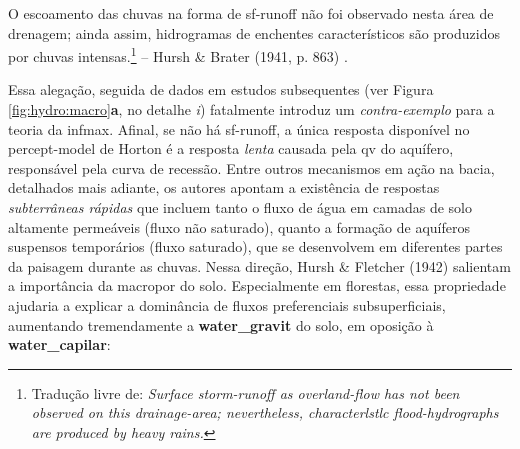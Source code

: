 \documentclass[./main.tex]{subfiles}
\begin{document}
\begin{adjustwidth}{100pt}{0pt}
\medskip
\small O escoamento das chuvas na forma de \gls{sf-runoff} não foi observado nesta área de drenagem; ainda assim, hidrogramas de enchentes característicos são produzidos por chuvas intensas.\footnote{Tradução livre de: \textit{Surface storm-runoff as overland-flow has not been observed on this drainage-area; nevertheless, characterlstlc flood-hydrographs are produced by heavy rains.}} -- Hursh \& Brater (1941, p. 863) \cite{Hursh1941}.
\medskip
\end{adjustwidth}

\noindent Essa alegação, seguida de dados em estudos subsequentes (ver Figura \ref{fig:hydro:macro}\textbf{a}, no detalhe \textit{i}) fatalmente introduz um \textit{contra-exemplo} para a \gls{teoria} da \gls{infmax}.  Afinal, se não há \gls{sf-runoff}, a única resposta disponível no \gls{percept-model} de Horton é a resposta \textit{lenta} causada pela \gls{qv} do aquífero, responsável pela curva de recessão. Entre outros mecanismos em ação na bacia, detalhados mais adiante, os autores apontam a existência de respostas \textit{subterrâneas rápidas} que incluem tanto o fluxo de água em camadas de solo altamente permeáveis (fluxo não saturado), quanto a formação de aquíferos suspensos temporários (fluxo saturado), que se desenvolvem em diferentes partes da paisagem durante as chuvas. Nessa direção, Hursh \& Fletcher (1942) \cite{Hursh1942} salientam a importância da \gls{macropor} do solo. Especialmente em florestas, essa propriedade ajudaria a explicar a dominância de fluxos preferenciais subsuperficiais, aumentando tremendamente a \textbf{\gls{water_gravit}} do solo, em oposição à \textbf{\gls{water_capilar}}:
\end{document}
